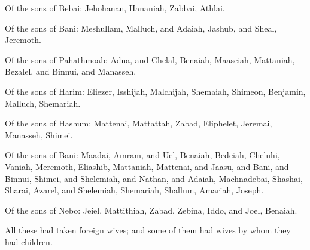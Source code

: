 {\par }{\LI {}Of the sons of Bebai: Jehohanan, Hananiah, Zabbai, Athlai.
\par }{\LI {}Of the sons of Bani: Meshullam, Malluch, and Adaiah, Jashub, and Sheal, Jeremoth.
\par }{\LI {}Of the sons of Pahathmoab: Adna, and Chelal, Benaiah, Maaseiah, Mattaniah, Bezalel, and Binnui, and Manasseh.
\par }{\LI {}Of the sons of Harim: Eliezer, Isshijah, Malchijah, Shemaiah, Shimeon,
Benjamin, Malluch, Shemariah.
\par }{\LI {}Of the sons of Hashum: Mattenai, Mattattah, Zabad, Eliphelet, Jeremai, Manasseh, Shimei.
\par }{\LI {}Of the sons of Bani: Maadai, Amram, and Uel,
Benaiah, Bedeiah, Cheluhi,
Vaniah, Meremoth, Eliashib,
Mattaniah, Mattenai, and Jaasu,
and Bani, and Binnui, Shimei,
and Shelemiah, and Nathan, and Adaiah,
Machnadebai, Shashai, Sharai,
Azarel, and Shelemiah, Shemariah,
Shallum, Amariah, Joseph.
\par }{\LI {}Of the sons of Nebo: Jeiel, Mattithiah, Zabad, Zebina, Iddo, and Joel, Benaiah.
\par }{\PP {}All these had taken foreign wives; and some of them had wives by whom they had children.
\par }